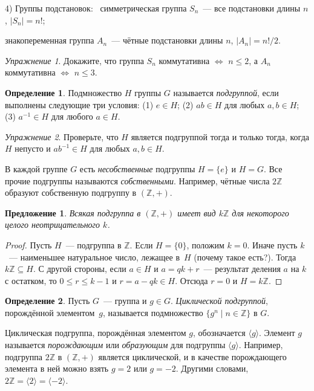 \documentclass[a4paper,10pt]{amsart}
\def\ZZ{{\mathbb Z}}%
\newtheorem{proposition}{Предложение}
\theoremstyle{definition}
\newtheorem{definition}{Определение}
\theoremstyle{remark}
\newtheorem{exc}{Упражнение}
\begin{document}
4) Группы подстановок: \ симметрическая группа $S_n$~--- все
подстановки длины $n$, $|S_n|=n!$;

знакопеременная группа $A_n$~--- чётные подстановки длины $n$,
$|A_n|=n!/2$.

\begin{exc}
Докажите, что группа $S_n$ коммутативна $\Leftrightarrow$ $n
\leqslant 2$, а $A_n$ коммутативна $\Leftrightarrow$ $n \leqslant
3$.
\end{exc}

\begin{definition}
Подмножество $H$ группы $G$ называется {\it подгруппой}, если выполнены следующие три условия: (1) $e \in H$; \quad (2) $ab\in H$ для любых $a,b
\in H$; \quad (3) $a^{-1}\in H$ для любого
$a\in H$.
\end{definition}

\begin{exc}
Проверьте, что $H$ является подгруппой тогда и только тогда, когда
 $H$ непусто и $ab^{-1}\in H$ для любых $a,b\in H$.
\end{exc}

В каждой группе $G$ есть {\it несобственные} подгруппы $H=\{e\}$ и
$H=G$. Все прочие подгруппы называются {\it собственными}. Например,
чётные числа $2\ZZ$ образуют собственную подгруппу в $(\ZZ,+)$.

\begin{proposition} \label{sbgrz}
Всякая подгруппа в $(\ZZ,+)$ имеет вид $k\ZZ$ для некоторого целого
неотрицательного $k$.
\end{proposition}

\begin{proof}
Пусть $H$~--- подгруппа в $\ZZ$. Если $H=\{0\}$, положим $k=0$.
Иначе пусть $k$~--- наименьшее натуральное число, лежащее в~$H$
(почему такое есть?). Тогда $k\ZZ \subseteq H$. С другой стороны,
если $a\in H$ и $a=qk+r$~--- результат деления $a$ на $k$ с
остатком, то $0 \leqslant r \leqslant k-1$ и $r = a - qk \in H$.
Отсюда $r=0$ и $H=k\ZZ$.
\end{proof}

\begin{definition}
Пусть $G$~--- группа и $g\in G$. {\it Циклической подгруппой},
порождённой элементом~$g$, называется подмножество $\{g^n \mid
n\in\ZZ\}$ в $G$.
\end{definition}

Циклическая подгруппа, порождённая элементом $g$, обозначается
$\langle g\rangle$. Элемент $g$ называется {\it порождающим} или
{\it образующим} для подгруппы $\langle g\rangle$. Например,
подгруппа $2\ZZ$ в $(\ZZ,+)$ является циклической, и в качестве
порождающего элемента в ней можно взять $g=2$ или $g=-2$. Другими
словами, $2\ZZ=\langle 2\rangle=\langle -2\rangle$.
\end{document}
